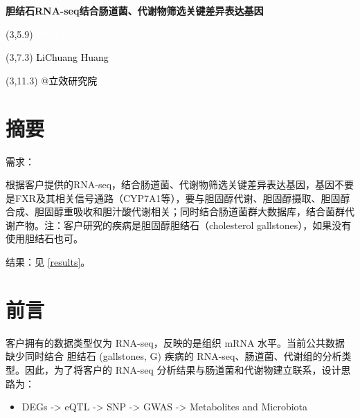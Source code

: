 \documentclass[
]{article}
\author{}
\date{\vspace{-2.5em}}
\providecommand{\tightlist}{%
  \setlength{\itemsep}{0pt}\setlength{\parskip}{0pt}}
\begin{document}
\begin{titlepage} 
\begin{center} \textbf{\Huge
胆结石RNA-seq结合肠道菌、代谢物筛选关键差异表达基因}
\vspace{4em} \begin{textblock}{10}(3,5.9) \huge
\textbf{\textcolor{white}{2024-01-02}}
\end{textblock} \begin{textblock}{10}(3,7.3)
\Large \textcolor{black}{LiChuang Huang}
\end{textblock} \begin{textblock}{10}(3,11.3)
\Large \textcolor{black}{@立效研究院}
\end{textblock} \end{center} \end{titlepage}
\restoregeometry


\tableofcontents

\listoffigures

\listoftables

\newpage


\hypertarget{abstract}{%
\section{摘要}\label{abstract}}

需求：

根据客户提供的RNA-seq，结合肠道菌、代谢物筛选关键差异表达基因，基因不要是FXR及其相关信号通路（CYP7A1等），要与胆固醇代谢、胆固醇摄取、胆固醇合成、胆固醇重吸收和胆汁酸代谢相关；同时结合肠道菌群大数据库，结合菌群代谢产物。注：客户研究的疾病是胆固醇胆结石（cholesterol gallstones），如果没有使用胆结石也可。

结果：见 \ref{results}。

\hypertarget{introduction}{%
\section{前言}\label{introduction}}

客户拥有的数据类型仅为 RNA-seq，反映的是组织 mRNA 水平。当前公共数据缺少同时结合 胆结石 (gallstones, G) 疾病的 RNA-seq、肠道菌、代谢组的分析类型。因此，为了将客户的 RNA-seq 分析结果与肠道菌和代谢物建立联系，设计思路为：

\begin{itemize}
\tightlist
\item
  DEGs -\textgreater{} eQTL -\textgreater{} SNP -\textgreater{} GWAS -\textgreater{} Metabolites and Microbiota
\end{itemize}
\end{document}

